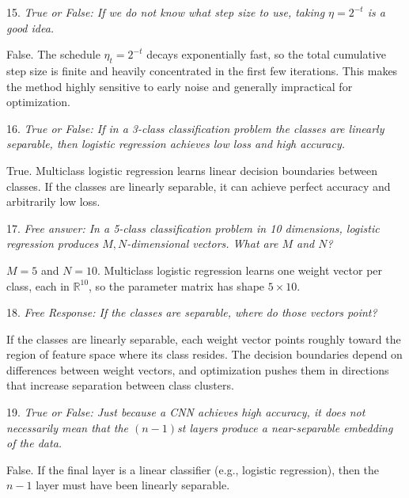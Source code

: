 \vspace{1cm}

15. \textit{True or False: If we do not know what step size to use, taking $\eta = 2^{-t}$ is a good idea.}

False. The schedule $\eta_t = 2^{-t}$ decays exponentially fast, so the total cumulative step size is finite and heavily concentrated in the first few iterations. This makes the method highly sensitive to early noise and generally impractical for optimization.


\vspace{1cm}

16. \textit{True or False: If in a 3-class classification problem the classes are linearly separable, then logistic regression achieves low loss and high accuracy.}

True. Multiclass logistic regression learns linear decision boundaries between classes. If the classes are linearly separable, it can achieve perfect accuracy and arbitrarily low loss.

\vspace{1cm}

17. \textit{Free answer: In a 5-class classification problem in 10 dimensions, logistic regression produces $M, N$-dimensional vectors. What are $M$ and $N$?}

$M = 5$ and $N = 10$. Multiclass logistic regression learns one weight vector per class, each in $\mathbb{R}^{10}$, so the parameter matrix has shape $5 \times 10$.

\vspace{1cm}

18. \textit{Free Response: If the classes are separable, where do those vectors point?}

If the classes are linearly separable, each weight vector points roughly toward the region of feature space where its class resides. The decision boundaries depend on differences between weight vectors, and optimization pushes them in directions that increase separation between class clusters.

\vspace{1cm}

19. \textit{True or False: Just because a CNN achieves high accuracy, it does not necessarily mean that the $(n-1)$st layers produce a near-separable embedding of the data.}

False. If the final layer is a linear classifier (e.g., logistic regression), then the $n-1$ layer must have been linearly separable.

